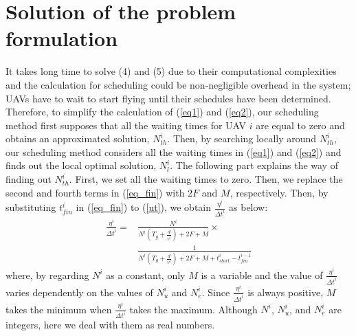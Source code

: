 \documentclass{ieeeaccess}
\begin{document}
%


\appendices
\section{Solution of the problem formulation}\label{ape}
It takes long time to solve (4) and (5) due to their computational complexities and the calculation for scheduling could be non-negligible overhead in the system; UAVs have to wait to start flying until their schedules have been determined.
Therefore, to simplify the calculation of (\ref{eq1}) and (\ref{eq2}), our scheduling method first supposes that all the waiting times for UAV $i$ are equal to zero and obtains an approximated solution, $N_{th}^i$.
Then, by searching locally around $N_{th}^i$, our scheduling method considers all the waiting times in (\ref{eq1}) and (\ref{eq2}) and finds out the local optimal solution, $N_{l}^i$.
The following part explains the way of finding out $N_{th}^i$.
%
First, we set all the waiting times to zero.
%
Then, we replace the second and fourth terms in (\ref{eq_fin}) with $2F$ and $M$, respectively.
%
Then, by substituting ${t_{fin}^i}$ in (\ref{eq_fin}) to (\ref{ut}), we obtain $\frac{\eta^i}{{\Delta{t}}^i}$ as below:
%
\begin{align}
\frac{\eta^{i}}{{\Delta{t}}^i}
=&\frac{N^i}{N^i({T_g}+\frac{d}{v^i})+2F+M}\times\nonumber\\
&\frac{1}{N^i({T_g}+\frac{d}{v^i})+2F+M+t_{start}^i-t_{fin}^{i-1}}\label{eq4}
\end{align}
%
where, by regarding $N^i$ as a constant, only $M$ is a variable and the value of $\frac{\eta^{i}}{{\Delta{t}}^i}$ varies dependently on the values of $N_u^i$ and $N_e^i$.
%
Since $\frac{\eta^{i}}{{\Delta{t}}^i}$ is always positive,  $M$ takes the minimum when $\frac{\eta^{i}}{{\Delta{t}}^i}$ takes the maximum. 
%
Although $N^i$, $N_u^i$, and $N_e^i$ are integers, here we deal with them as real numbers.
\end{document}
